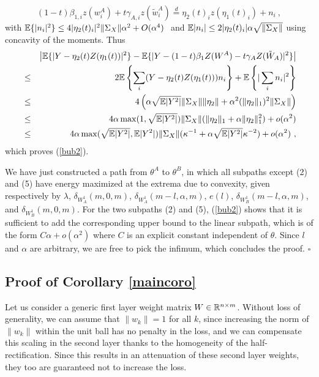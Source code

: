 $$(1-t) \beta_{1,i} z(w^A_i) + t \gamma_{A,i} z(\tilde{w}^A_i) \stackrel{d}{=} \eta_2(t)_i z(\eta_1(t)_i) + n_i ~,$$
with ${\mathbb{E}}\{ |n_i |^2 \} \leq 4 |\eta_2(t)_i|^2 \| \Sigma_X \| \alpha^2 + O(\alpha^4)~$ and ${\mathbb{E}} |n_i| \leq 2 |\eta_2(t)_i| \alpha \sqrt{\| \Sigma_X\|}$ using concavity of the moments.
Thus 
\begin{eqnarray*}
&& \left | {\mathbb{E}} \{ | Y - \eta_2(t) Z(\eta_1(t) ) |^2 \}  - {\mathbb{E}} \{ | Y - (1-t) \beta_1 Z(W^A) - t \gamma_A Z(\tilde{W}_A) |^2 \} \right| \\
 &\leq& 2{\mathbb{E}} \left\{  \sum_i (Y - \eta_2(t) Z(\eta_1(t) )) n_i  \right\} + {\mathbb{E}} \left\{ | \sum_i n_i |^2 \right\} \\
 &\leq & 4\left(\alpha \sqrt{{\mathbb{E}}|Y^2|} \| \Sigma_X\|  \| \eta_2 \| + \alpha^2 (\| \eta_2 \|_1)^2  \| \Sigma_X \| \right) \\
 &\leq & 4 \alpha \max(1, \sqrt{{\mathbb{E}}|Y^2|}) \| \Sigma_X \| ( \| \eta_2 \|_1 + \alpha \| \eta_2 \|_1^2) + o(\alpha^2) \\
 & \leq & 4 \alpha \max(\sqrt{{\mathbb{E}}|Y^2|}, {{\mathbb{E}}|Y^2|}) \| \Sigma_X \|  ( \kappa^{-1} + \alpha \sqrt{{\mathbb{E}}|Y^2|} \kappa^{-2}) + o(\alpha^2)~,
\end{eqnarray*}
 which proves (\ref{bub2}). 
 
We have just constructed a path from $\theta^A$ to $\theta^B$, in which all subpaths except (2) and (5) have energy maximized at the extrema due to convexity, given respectively by $\lambda$, $\delta_{W_A^1}(m, 0, m)$, $\delta_{W_A^1}(m-l, \alpha, m)$, $e(l)$, $\delta_{W_B^1}(m-l, \alpha, m)$, and 
$\delta_{W_B^1}(m, 0, m)$.  For the two subpaths (2) and (5), (\ref{bub2}) shows that it is sufficient to add the corresponding upper bound to the linear subpath, which is of the form $C \alpha + o(\alpha^2)$ where $C$ is an explicit constant independent of $\theta$. Since $l$ and $\alpha$ are arbitrary, we are free to pick the infimum, which concludes the proof. $\square$
 




\subsection{Proof of Corollary \ref{maincoro}}

Let us consider a generic first layer weight matrix $W \in {\mathbb{R}}^{n \times m}$. Without loss of generality, we can assume that $\| w_k \|=1$ for all $k$, since increasing the norm of $\|w_k\|$ 
within the unit ball has no penalty in the loss, and we can compensate this scaling in the second layer
thanks to the homogeneity of the half-rectification. Since this results in an attenuation of these second layer weights, 
they too are guaranteed not to increase the loss. 

